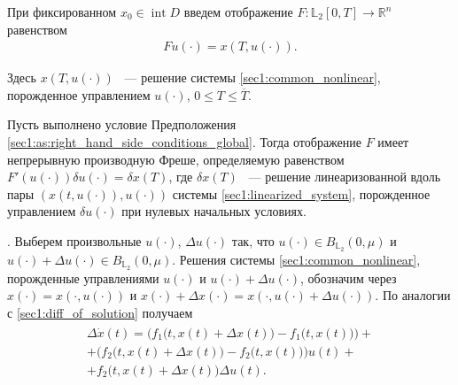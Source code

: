 \documentclass[../main.tex]{subfiles}
\begin{document}
    
При фиксированном $x_0 \in \operatorname{int} D $ введем отображение $F: \mathbb{L}_2[0,T] \rightarrow \mathbb{R}^n $ равенством 
\begin{gather}\label{sec1:solution_endpoint_mapping}
    Fu(\cdot) = x(T,u(\cdot)).
\end{gather}
    
 Здесь $ x(T,u(\cdot))$ ~--- решение системы \eqref{sec1:common_nonlinear}, порожденное управлением $u(\cdot)$, $0 \leqslant T \leqslant \overline{T}$. 
    
\begin{lemma}\label{sec1:lem:frechet_derivative_common}
    Пусть выполнено условие Предположения \ref{sec1:as:right_hand_side_conditions_global}.
    Тогда отображение $F$ имеет непрерывную производную Фреше, определяемую равенством $ F'(u(\cdot))\delta u(\cdot) =\delta x(T)$, где $\delta x(T)$ ~--- решение линеаризованной вдоль пары $\left( x(t,u(\cdot)),u(\cdot)\right)  $ системы \eqref{sec1:linearized_system}, порожденное управлением $\delta u(\cdot)$ при нулевых начальных условиях.
\end{lemma}
\doc. 
Выберем произвольные $u(\cdot)$, $\Delta u(\cdot)$ так, что $ u(\cdot) \in B_{\mathbb{L}_2}(0,\mu)$ и $ u(\cdot) +  \Delta u(\cdot) \in B_{\mathbb{L}_2}(0,\mu)$.
Решения системы \eqref{sec1:common_nonlinear}, порожденные управлениями  $u(\cdot)$ и $u(\cdot) + \Delta u(\cdot)$, обозначим через  $x(\cdot) = x(\cdot,u(\cdot))$ и $ x(\cdot) + \Delta x(\cdot) = x(\cdot, u(\cdot) + \Delta u(\cdot))$.
По аналогии с \eqref{sec1:diff_of_solution} получаем
\begin{gather}\label{sec1:delta_x}
\begin{gathered}
    \Delta \dot{x}(t) =
    \Big( f_1\big(t, x(t)+\Delta x(t)\big) - f_1\big(t, x(t)\big) \Big)  +  \\ + 
     \Big( f_2\big(t, x(t)+\Delta x(t)\big) - f_2\big(t,x(t)\big) \Big) u(t)  + \\ +
    f_2\big(t, x(t)+\Delta x(t)\big)  \Delta u(t) . 
\end{gathered}
\end{gather}
    
\end{document}

